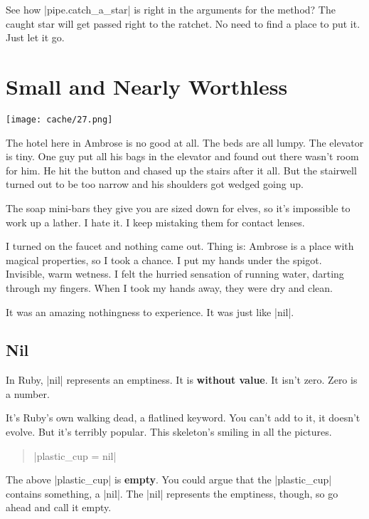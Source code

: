 \documentclass[12pt,twoside]{report}
\begin{document}
See how \rubyinline|pipe.catch_a_star| is right in the
arguments for the method?  The caught star will get passed right to
the ratchet.  No need to find a place to put it.  Just let it go.


\section{Small and Nearly Worthless}


	\texttt{[image: cache/27.png]}

The hotel here in Ambrose is no good at all.  The beds are all
lumpy. The elevator is tiny.  One guy put all his bags in the elevator
and found out there wasn't room for him.  He hit the button and chased
up the stairs after it all.  But the stairwell turned out to be too
narrow and his shoulders got wedged going up.

The soap mini-bars they give you are sized down for elves, so it's
impossible to work up a lather.  I hate it.  I keep mistaking them for
contact lenses.

I turned on the faucet and nothing came out.  Thing is: Ambrose is a
place with magical properties, so I took a chance.  I put my hands
under the spigot.  Invisible, warm wetness.  I felt the hurried
sensation of running water, darting through my fingers.  When I took
my hands away, they were dry and clean.

It was an amazing nothingness to experience.  It was just like
\rubyinline|nil|.



\subsection{Nil}



In Ruby, \rubyinline|nil| represents an emptiness.  It
is {\bf without value}.  It isn't zero. Zero is a number.

It's Ruby's own walking dead, a flatlined keyword.  You can't add to
it, it doesn't evolve.  But it's terribly popular.  This skeleton's
smiling in all the pictures.

\begin{quote}
\rubyinline|plastic_cup = nil|\end{quote}


The above \rubyinline|plastic_cup| is {\bf empty}.
You could argue that the \rubyinline|plastic_cup|
contains something, a \rubyinline|nil|.  The
\rubyinline|nil| represents the emptiness, though, so
go ahead and call it empty.
\end{document}
